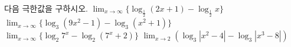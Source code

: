 다음 극한값을 구하시오.
 $\displaystyle\lim_{x\to\infty}\{\log_{\frac{1}{2}}(2x+1)-\log_{\frac{1}{2}}x\}$
 $\displaystyle\lim_{x\to\infty}\{\log_3(9x^2-1)-\log_3(x^2+1)\}$
 $\displaystyle\lim_{x\to\infty}\{\log_2 7^x-\log_2(7^x+2)\}$
 $\displaystyle\lim_{x\to 2}(\log_3|x^2-4|-\log_3|x^3-8|)$
